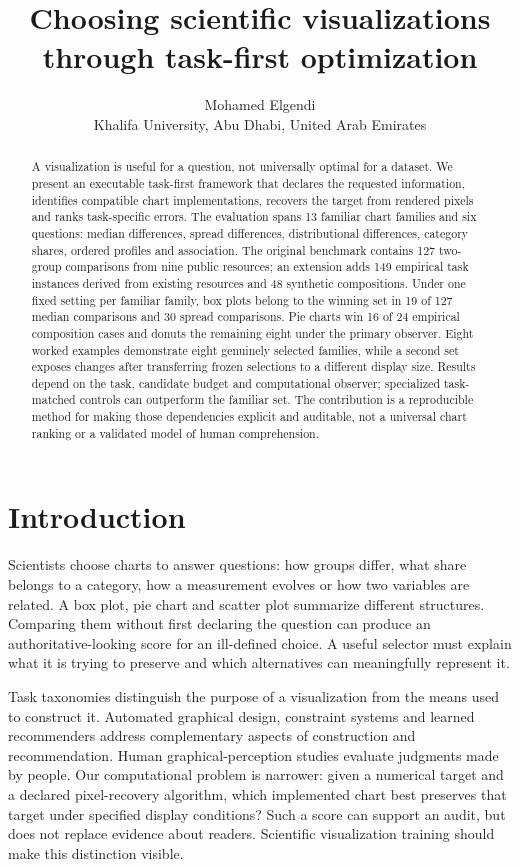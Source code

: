 \documentclass[11pt]{article}
\title{Choosing scientific visualizations through task-first optimization}
\author{Mohamed Elgendi\\Khalifa University, Abu Dhabi, United Arab Emirates}
\date{}
\begin{document}
\maketitle
\begin{abstract}
A visualization is useful for a question, not universally optimal for a dataset. We present an executable task-first framework that declares the requested information, identifies compatible chart implementations, recovers the target from rendered pixels and ranks task-specific errors. The evaluation spans 13 familiar chart families and six questions: median differences, spread differences, distributional differences, category shares, ordered profiles and association. The original benchmark contains 127 two-group comparisons from nine public resources; an extension adds 149 empirical task instances derived from existing resources and 48 synthetic compositions. Under one fixed setting per familiar family, box plots belong to the winning set in 19 of 127 median comparisons and 30 spread comparisons. Pie charts win 16 of 24 empirical composition cases and donuts the remaining eight under the primary observer. Eight worked examples demonstrate eight genuinely selected families, while a second set exposes changes after transferring frozen selections to a different display size. Results depend on the task, candidate budget and computational observer; specialized task-matched controls can outperform the familiar set. The contribution is a reproducible method for making those dependencies explicit and auditable, not a universal chart ranking or a validated model of human comprehension.
\end{abstract}

\section*{Introduction}
Scientists choose charts to answer questions: how groups differ, what share belongs to a category, how a measurement evolves or how two variables are related. A box plot, pie chart and scatter plot summarize different structures. Comparing them without first declaring the question can produce an authoritative-looking score for an ill-defined choice. A useful selector must explain what it is trying to preserve and which alternatives can meaningfully represent it.

Task taxonomies distinguish the purpose of a visualization from the means used to construct it.\cite{amar2005,brehmer2013} Automated graphical design, constraint systems and learned recommenders address complementary aspects of construction and recommendation.\cite{mackinlay1986,draco,vizml} Human graphical-perception studies evaluate judgments made by people.\cite{cleveland1984,heer2010} Our computational problem is narrower: given a numerical target and a declared pixel-recovery algorithm, which implemented chart best preserves that target under specified display conditions? Such a score can support an audit, but does not replace evidence about readers. Scientific visualization training should make this distinction visible.\cite{elgendi2017,elgendi2020}
\end{document}
